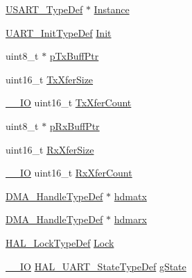\begin{DoxyCompactItemize}
\item 
\mbox{\hyperlink{struct_u_s_a_r_t___type_def}{U\+S\+A\+R\+T\+\_\+\+Type\+Def}} $\ast$ \mbox{\hyperlink{struct_u_a_r_t___handle_type_def_a2b30b6d22df80fbebd8ceefc6f162310}{Instance}}
\item 
\mbox{\hyperlink{struct_u_a_r_t___init_type_def}{U\+A\+R\+T\+\_\+\+Init\+Type\+Def}} \mbox{\hyperlink{struct_u_a_r_t___handle_type_def_a6b5ab0619ea07655a7f3bc92f78fafaa}{Init}}
\item 
uint8\+\_\+t $\ast$ \mbox{\hyperlink{struct_u_a_r_t___handle_type_def_a5cc31f7c52dafd32f27f8f2756dbf343}{p\+Tx\+Buff\+Ptr}}
\item 
uint16\+\_\+t \mbox{\hyperlink{struct_u_a_r_t___handle_type_def_a80907b65d6f9541bc0dee444d16bc45b}{Tx\+Xfer\+Size}}
\item 
\mbox{\hyperlink{core__sc300_8h_aec43007d9998a0a0e01faede4133d6be}{\+\_\+\+\_\+\+IO}} uint16\+\_\+t \mbox{\hyperlink{struct_u_a_r_t___handle_type_def_a1823437fbed80bdd1510782ced4e5532}{Tx\+Xfer\+Count}}
\item 
uint8\+\_\+t $\ast$ \mbox{\hyperlink{struct_u_a_r_t___handle_type_def_a7cee540cb21048ac48ba17355440e668}{p\+Rx\+Buff\+Ptr}}
\item 
uint16\+\_\+t \mbox{\hyperlink{struct_u_a_r_t___handle_type_def_ac12f5f1f6295b3c3327d5feabf5a96fb}{Rx\+Xfer\+Size}}
\item 
\mbox{\hyperlink{core__sc300_8h_aec43007d9998a0a0e01faede4133d6be}{\+\_\+\+\_\+\+IO}} uint16\+\_\+t \mbox{\hyperlink{struct_u_a_r_t___handle_type_def_ad95a26d6b12b7087bba3d1b769175db2}{Rx\+Xfer\+Count}}
\item 
\mbox{\hyperlink{group___d_m_a___exported___types_ga41b754a906b86bce54dc79938970138b}{D\+M\+A\+\_\+\+Handle\+Type\+Def}} $\ast$ \mbox{\hyperlink{struct_u_a_r_t___handle_type_def_a33e13c28b1a70e6164417abb026d7a22}{hdmatx}}
\item 
\mbox{\hyperlink{group___d_m_a___exported___types_ga41b754a906b86bce54dc79938970138b}{D\+M\+A\+\_\+\+Handle\+Type\+Def}} $\ast$ \mbox{\hyperlink{struct_u_a_r_t___handle_type_def_abd0aeec20298a55d89a440320e35634f}{hdmarx}}
\item 
\mbox{\hyperlink{stm32f4xx__hal__def_8h_ab367482e943333a1299294eadaad284b}{H\+A\+L\+\_\+\+Lock\+Type\+Def}} \mbox{\hyperlink{struct_u_a_r_t___handle_type_def_ad4cf225029dbefe8d3fe660c33b8bb6b}{Lock}}
\item 
\mbox{\hyperlink{core__sc300_8h_aec43007d9998a0a0e01faede4133d6be}{\+\_\+\+\_\+\+IO}} \mbox{\hyperlink{group___u_a_r_t___exported___types_gaf55d844a35379c204c90be5d1e8e50ba}{H\+A\+L\+\_\+\+U\+A\+R\+T\+\_\+\+State\+Type\+Def}} \mbox{\hyperlink{struct_u_a_r_t___handle_type_def_ab596705b6ce037e8debc149ccee148da}{g\+State}}

\end{DoxyCompactItemize}
